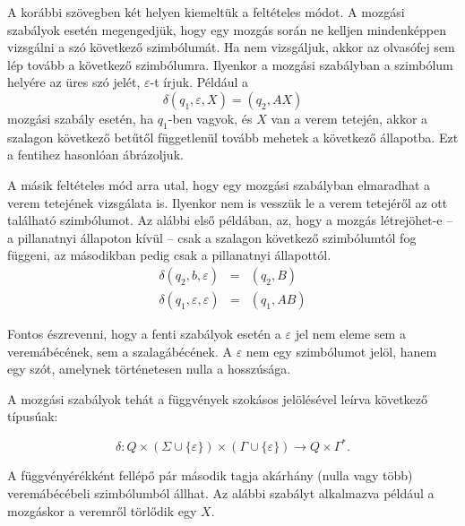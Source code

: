 \documentclass[a4paper]{article}
\begin{document}

A korábbi szövegben két helyen kiemeltük a feltételes módot.
A mozgási szabályok esetén megengedjük, hogy egy mozgás során ne kelljen
mindenképpen vizsgálni a szó következő szimbólumát. Ha nem vizsgáljuk,
akkor az olvasófej sem lép tovább a következő szimbólumra. Ilyenkor a
mozgási szabályban a szimbólum helyére az üres szó jelét,
$\varepsilon$-t írjuk. Például a 
\[\delta(q_1, \varepsilon, X) = (q_2, AX)\]
mozgási szabály esetén, ha $q_1$-ben vagyok, és $X$ van a verem tetején,
akkor a szalagon következő betűtől függetlenül tovább mehetek a
következő állapotba. Ezt a fentihez hasonlóan ábrázoljuk.


A másik feltételes mód arra utal, hogy egy mozgási szabályban elmaradhat
a verem tetejének vizsgálata is. Ilyenkor nem is vesszük le a verem
tetejéről az ott található szimbólumot. Az alábbi első példában, az,
hogy a mozgás létrejöhet-e -- a pillanatnyi állapoton kívül -- csak a
szalagon következő szimbólumtól fog függeni, az másodikban pedig csak a
pillanatnyi állapottól.
\begin{eqnarray*}
    \delta(q_2, b, \varepsilon) &=& (q_2, B)\\
    \delta(q_1, \varepsilon, \varepsilon) &=& (q_1, AB)
\end{eqnarray*}

Fontos észrevenni, hogy a fenti szabályok esetén a $\varepsilon$ jel nem
eleme sem a veremábécének, sem a szalagábécének. A $\varepsilon$ nem egy
szimbólumot jelöl, hanem egy szót, amelynek történetesen nulla a
hosszúsága.

A mozgási szabályok tehát a függvények szokásos jelölésével leírva
következő típusúak:

\[\delta:
 Q\times (\Sigma \cup \{\varepsilon\}) \times (\Gamma \cup \{\varepsilon\})
 \longrightarrow
 Q \times \Gamma^*.
\]

A függvényérékként fellépő pár második tagja akárhány (nulla vagy több)
veremábécébeli szimbólumból állhat. Az alábbi szabályt alkalmazva
például a mozgáskor a veremről törlődik egy $X$.
\end{document}
